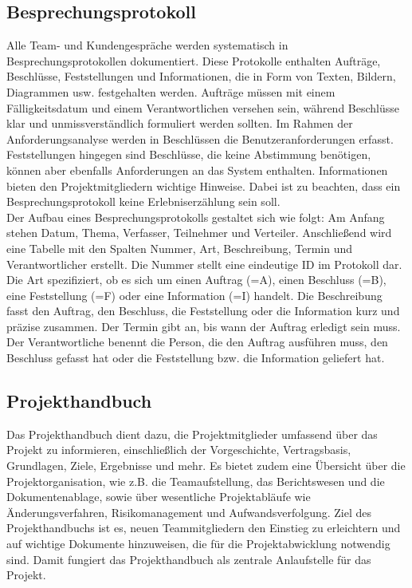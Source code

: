 \subsection{Besprechungsprotokoll}  \label{Besprechungsprotokoll}

Alle Team- und Kundengespräche werden systematisch in Besprechungsprotokollen dokumentiert. Diese Protokolle enthalten 
Aufträge, Beschlüsse, Feststellungen und Informationen, die in Form von Texten, Bildern, Diagrammen usw. festgehalten 
werden. Aufträge müssen mit einem Fälligkeitsdatum und einem Verantwortlichen versehen sein, während Beschlüsse klar 
und unmissverständlich formuliert werden sollten. Im Rahmen der Anforderungsanalyse werden in Beschlüssen die 
Benutzeranforderungen erfasst. Feststellungen hingegen sind Beschlüsse, die keine Abstimmung benötigen, können 
aber ebenfalls Anforderungen an das System enthalten. Informationen bieten den Projektmitgliedern wichtige Hinweise. 
Dabei ist zu beachten, dass ein Besprechungsprotokoll keine Erlebniserzählung sein soll.\\

Der Aufbau eines Besprechungsprotokolls gestaltet sich wie folgt: Am Anfang stehen Datum, Thema, Verfasser, 
Teilnehmer und Verteiler. Anschließend wird eine Tabelle mit den Spalten Nummer, Art, Beschreibung, Termin und 
Verantwortlicher erstellt. Die Nummer stellt eine eindeutige ID im Protokoll dar. Die Art spezifiziert, ob es sich 
um einen Auftrag (=A), einen Beschluss (=B), eine Feststellung (=F) oder eine Information (=I) handelt. Die 
Beschreibung fasst den Auftrag, den Beschluss, die Feststellung oder die Information kurz und präzise zusammen. Der 
Termin gibt an, bis wann der Auftrag erledigt sein muss. Der Verantwortliche benennt die Person, die den Auftrag 
ausführen muss, den Beschluss gefasst hat oder die Feststellung bzw. die Information geliefert hat.

\subsection{Projekthandbuch}  \label{Projekthandbuch}

Das Projekthandbuch dient dazu, die Projektmitglieder umfassend über das Projekt zu informieren, einschließlich der 
Vorgeschichte, Vertragsbasis, Grundlagen, Ziele, Ergebnisse und mehr. Es bietet zudem eine Übersicht über die 
Projektorganisation, wie z.B. die Teamaufstellung, das Berichtswesen und die Dokumentenablage, sowie über wesentliche 
Projektabläufe wie Änderungsverfahren, Risikomanagement und Aufwandsverfolgung. Ziel des Projekthandbuchs ist es, neuen 
Teammitgliedern den Einstieg zu erleichtern und auf wichtige Dokumente hinzuweisen, die für die Projektabwicklung 
notwendig sind. Damit fungiert das Projekthandbuch als zentrale Anlaufstelle für das Projekt.\\

